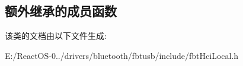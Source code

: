 \subsection*{额外继承的成员函数}


该类的文档由以下文件生成\+:\begin{DoxyCompactItemize}
\item 
E\+:/\+React\+O\+S-\/0../drivers/bluetooth/fbtusb/include/fbt\+Hci\+Local.\+h\end{DoxyCompactItemize}
